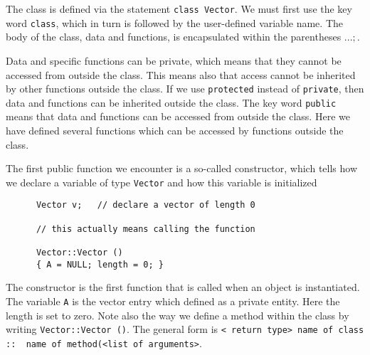 The class is defined via the statement \verb?class Vector?. We must first use the key word 
\verb?class?, which in turn is followed by the user-defined variable name. 
The body of the class, data and functions, is encapsulated  within the parentheses ${...};$.

Data and specific functions can be private, which means that they cannot be accessed from outside the class.
This means also that access cannot be inherited by other functions outside the class. If we use \verb?protected?
instead of \verb?private?, then data and functions can be inherited outside the class.
The key word \verb?public? means  that data and functions can be accessed from outside the class.
Here we have defined several functions  which can be accessed by functions outside the class.

The first public function we encounter is a so-called   
constructor, which  tells how we declare a variable of type \verb?Vector?
and how this variable is initialized
\begin{lstlisting}
      Vector v;   // declare a vector of length 0

      // this actually means calling the function

      Vector::Vector ()    
      { A = NULL; length = 0; }
\end{lstlisting}
The constructor is the first function that is called when an object is instantiated.
The variable \verb?A? is the vector entry which defined as a private entity. 
Here the length is set to zero.
Note also the way we define a method within the class by writing
\verb?Vector::Vector ()?. The general form is
\verb?< return type> name of class ::  name of method(<list of arguments>?.

